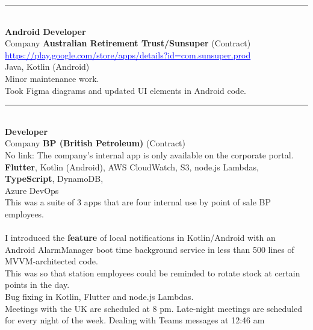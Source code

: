 \documentclass{article}
\begin{document}
%

\noindent\hfil\rule{0.5\textwidth}{.4pt}\hfil
\\

\textbf{ Android Developer }\\
Company  \textbf {Australian Retirement Trust/Sunsuper} (Contract)  \\

\textcolor{blue} { \underline{ https://play.google.com/store/apps/details?id=com.sunsuper.prod   } }  \\



 Java, Kotlin (Android) \\

Minor maintenance work. \\
Took Figma diagrams and updated UI elements in Android code. \\

\noindent\hfil\rule{0.5\textwidth}{.4pt}\hfil
\\

\textbf{ Developer }\\
Company  \textbf {BP (British Petroleum)}  (Contract) \\
No link: The company's internal app is only available on the corporate portal. \\

\textbf{Flutter}, Kotlin (Android), AWS CloudWatch, S3, node.js Lambdas, \textbf{TypeScript}, DynamoDB, \\ 
Azure DevOps  \\

This was a suite of 3 apps that are four internal use by point of sale BP employees. \\
\\
I introduced the {\bf feature} of local notifications in Kotlin/Android with an Android AlarmManager boot time background service in less than 500 lines of MVVM-architected code. \\
This was so that station employees could be reminded to rotate stock at certain points in the day. \\
 Bug fixing in Kotlin, Flutter and node.js Lambdas. \\
 Meetings with the UK are scheduled at 8 pm. Late-night meetings are scheduled for every night of the week. Dealing with Teams messages at 12:46 am \\
\\
\end{document}
